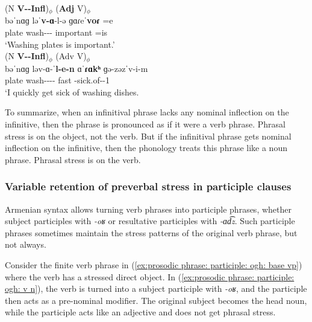 \begin{exe}
	\ex \begin{xlist}
		\ex \glll  (N \textbf{V-{\infgloss}-Infl})$_\phi$ (\textbf{Adj} V)$_\phi$\\ 
		bəˈ{nɑɡ}  ləˈ\textbf{v-ɑ}-l-ə ɡɑɾeˈ\textbf{voɾ} =e\\
		plate  wash-{\thgloss}-{\infgloss}-{} important =is \\
		\trans `Washing  plates is important.'\label{prosodic phrase: noun verb: v inf infl ə adj v} 
		\\  
		\ex \glll  (N \textbf{V-{\infgloss}-Infl})$_\phi$ (Adv V)$_\phi$\\ 
		bəˈ{nɑɡ}  lə{v-ɑ}-ˈ\textbf{l-e-n}  ɑˈ\textbf{ɾɑkʰ} ɡə-zəzˈv-i-m\\
		plate  wash-{\thgloss}-{\infgloss}-{\abl}-{} fast {\ind}-sick.of-{\thgloss}-1{\sg}\\
		\trans `I quickly get sick of washing dishes. \label{prosodic phrase: noun verb: v inf infl case v} 
		\\  
	\end{xlist}
\end{exe}

To summarize,  when an infinitival phrase lacks any nominal inflection on the infinitive, then the phrase is pronounced as if it were a verb phrase. Phrasal stress is on the object, not the verb. But if the infinitival phrase gets nominal inflection on the infinitive, then the phonology treats this phrase like a noun phrase. Phrasal stress is on the verb. 
\subsubsection{Variable retention of preverbal stress in participle  clauses}\label{section:intonation:phrase:nounverb:participle}

Armenian syntax allows turning verb phrases into participle phrases, whether subject participles with \textit{-oʁ} or resultative participles with \textit{-ɑd͡z}. Such participle phrases sometimes maintain the stress patterns of the original verb phrase, but not always. 


Consider the finite verb phrase in (\ref{ex:prosodic phrase: participle: ogh: base vp}) where the verb has a stressed direct object. In  (\ref{ex:prosodic phrase: participle: ogh: v n}), the verb is   turned into a subject participle with \textit{-oʁ}, and the participle then acts as a pre-nominal modifier.  The original subject becomes the head noun, while the participle acts like an adjective and does not get phrasal stress.

